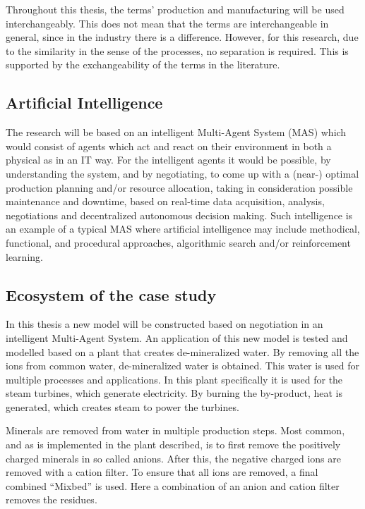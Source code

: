 Throughout this thesis, the terms' production and manufacturing will be used interchangeably. This does not mean that the terms are interchangeable in general, since in the industry there is a difference. However, for this research, due to the similarity in the sense of the processes, no separation is required. This is supported by the exchangeability of the terms in the literature. 

\subsection{Artificial Intelligence}
The research will be based on an intelligent Multi-Agent System (MAS) which would consist of agents which act and react on their environment in both a physical as in an IT way. For the intelligent agents it would be possible, by understanding the system, and by negotiating, to come up with a (near-) optimal production planning and/or resource allocation, taking in consideration possible maintenance and downtime, based on real-time data acquisition, analysis, negotiations and decentralized autonomous decision making. Such intelligence is an example of a typical MAS where artificial intelligence may include methodical, functional, and procedural approaches, algorithmic search and/or reinforcement learning. 

\subsection{Ecosystem of the case study}
\label{sec:intro_ecosystem}
In this thesis a new model will be constructed based on negotiation in an intelligent Multi-Agent System. An application of this new model is tested and modelled based on a plant that creates de-mineralized water. By removing all the ions from common water, de-mineralized water is obtained. This water is used for multiple processes and applications. In this plant specifically it is used for the steam turbines, which generate electricity. By burning the by-product, heat is generated, which creates steam to power the turbines. 

Minerals are removed from water in multiple production steps. Most common, and as is implemented in the plant described, is to first remove the positively charged minerals in so called anions. After this, the negative charged ions are removed with a cation filter. To ensure that all ions are removed, a final combined ``Mixbed'' is used. Here a combination of an anion and cation filter removes the residues.

